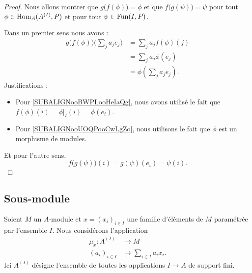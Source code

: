 \begin{proof}
    Nous allons montrer que \( g\big( f(\phi) \big)=\phi\) et que \( f\big( g(\psi) \big)=\psi\) pour tout \( \phi\in\operatorname{Hom}_A(A^{(I)},P)\) et pour tout \( \psi\in \operatorname{Fun}(I,P)\).

    Dans un premier sens nous avons :
    \begin{subequations}
        \begin{align}
            g\big( f(\phi) \big)\big( \sum_ja_je_j \big)&=\sum_ja_jf(\phi)(j)\\
            &=\sum_ja_j\phi(e_j)\label{SUBALIGNooBWPLooHeIaQg}\\
            &=\phi(\sum_ja_je_j)        \label{SUBALIGNooUOQPooCwLgZo}.
        \end{align}
    \end{subequations}
    Justifications :
    \begin{itemize}
        \item 
            Pour \eqref{SUBALIGNooBWPLooHeIaQg}, nous avons utilisé le fait que \( f(\phi)(i)=\phi|_I(i)=\phi(e_i)\).
        \item
            Pour \eqref{SUBALIGNooUOQPooCwLgZo}, nous utilisons le fait que \( \phi\) est un morphisme de modules.
    \end{itemize}
    Et pour l'autre sens,
    \begin{equation}
        f\big( g(\psi) \big)(i)=g(\psi)(e_i)=\psi(i).
    \end{equation}
\end{proof}

\subsection{Sous-module}

Soient \( M\) un \( A\)-module et \( x=(x_i)_{i\in I}\) une famille d'éléments de \( M\) paramétrée par l'ensemble \( I\). Nous considérons l'application
\begin{equation}
    \begin{aligned}
        \mu_x\colon A^{(I)}&\to M \\
        (a_i)_{i\in I}&\mapsto \sum_{i\in I}a_ix_i.
    \end{aligned}
\end{equation}
Ici \( A^{(I)}\) désigne l'ensemble de toutes les applications \( I\to A\) de support fini.

